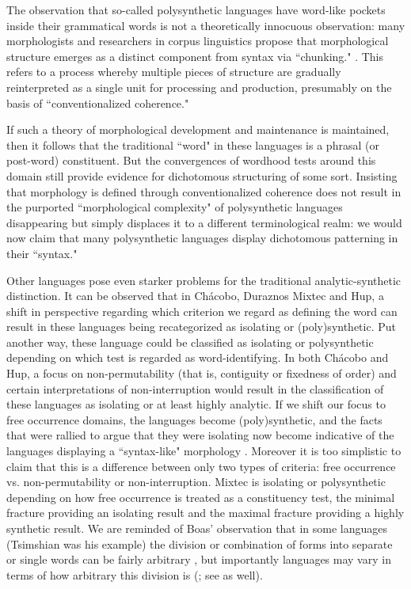 \documentclass[output=paper,draftmode]{langscibook}
\begin{document}
The observation that so-called polysynthetic languages have word-like pockets inside their grammatical words is not a theoretically innocuous observation: many morphologists and researchers in corpus linguistics propose that morphological structure emerges as a distinct component from syntax via ``chunking." \citep{bybee2001phonology, Bybee2010, lorenz2019chunking}. This refers to a process whereby multiple pieces of structure are gradually reinterpreted as a single unit for processing and production, presumably on the basis of ``conventionalized coherence."

If such a theory of morphological development and maintenance is maintained, then it follows that the traditional ``word" in these languages is a phrasal (or post-word) constituent. But the convergences of wordhood tests around this domain still provide evidence for dichotomous structuring of some sort. Insisting that morphology is defined through conventionalized coherence does not result in the purported ``morphological complexity" of polysynthetic languages disappearing but simply displaces it to a different terminological realm: we would now claim that many polysynthetic languages display dichotomous patterning in their ``syntax." 

Other languages pose even starker problems for the traditional analytic-syn\-thetic distinction. It can be observed that in Chácobo, Duraznos Mixtec and Hup, a shift in perspective regarding which criterion we regard as defining the word can result in these languages being recategorized as isolating or (poly)synthetic. Put another way, these language could be classified as isolating or polysynthetic depending on which test is regarded as word-identifying. In both Chácobo and Hup, a focus on non-permutability (that is, contiguity or fixedness of order) and certain interpretations of non-interruption would result in the classification of these languages as isolating or at least highly analytic. If we shift our focus to free occurrence domains, the languages become (poly)synthetic, and the facts that were rallied to argue that they were isolating now become indicative of the languages displaying a ``syntax-like" morphology \citep{Payne1990, tallman2018morphological}. 
Moreover it is too simplistic to claim that this is a difference between only two types of criteria: free occurrence vs. non-permutability or non-interruption. Mixtec is isolating or polysynthetic depending on how free occurrence is treated as a constituency test, the minimal fracture providing an isolating result and the maximal fracture providing a highly synthetic result. We are reminded of Boas' observation that in some languages (Tsimshian was his example) the division or combination of forms into separate or single words can be fairly arbitrary \citep[28]{boas1911introduction}, but importantly languages may vary in terms of how arbitrary this division is (\citealt[26]{boas1911introduction}; see \citealt[68]{bazell1953linguistic} as well).
\end{document}
